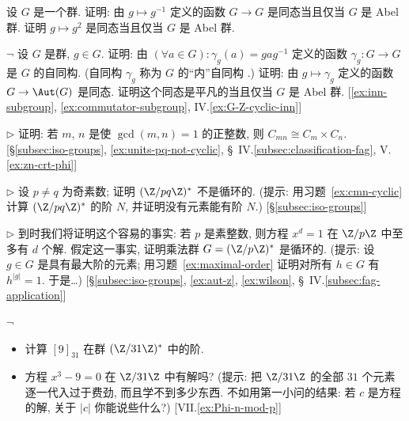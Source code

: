\begin{prob}
\label{ex:inverse-hom}
设 $G$ 是一个群. 证明: 由 $g \mapsto g^{-1}$ 定义的函数 $G \to G$ 是同态当且仅当 $G$ 是 Abel 群. 证明 $g \mapsto g^2$ 是同态当且仅当 $G$ 是 Abel 群.
\end{prob}

\begin{prob}
\label{ex:inner-automorphisms}
$\neg$ 设 $G$ 是群, $g \in G$. 证明: 由 $(\forall a \in G): \gamma_g(a) = gag^{-1}$ 定义的函数 $\gamma_g : G \to G$ 是 $G$ 的自同构. (自同构 $\gamma_g$ 称为 $G$ 的``内''自同构%
.) 证明: 由 $g \mapsto \gamma_g$ 定义的函数 $G \to \Aut(G)$ 是同态. 证明这个同态是平凡的当且仅当 $G$ 是 Abel 群. [\ref{ex:inn-subgroup}, \ref{ex:commutator-subgroup}, IV.\ref{ex:G-Z-cyclic-inn}]
\end{prob}

\begin{prob}
\label{ex:cmn-cyclic}
$\triangleright$ 证明: 若 $m$, $n$ 是使 $\gcd(m,n) = 1$ 的正整数, 则 $C_{mn} \cong C_m \times C_n$. [\S\ref{subsec:iso-groups}, \ref{ex:units-pq-not-cyclic}, \S~IV.\ref{subsec:classification-fag}, V.\ref{ex:zn-crt-phi}]
\end{prob}

\begin{prob}
\label{ex:units-pq-not-cyclic}
$\triangleright$ 设 $p \neq q$ 为奇素数; 证明 $(\Z/pq\Z)^{*}$ 不是循环的. (提示: 用习题~\ref{ex:cmn-cyclic} 计算 $(\Z/pq\Z)^{*}$ 的阶 $N$, 并证明没有元素能有阶 $N$.) [\S\ref{subsec:iso-groups}]
\end{prob}

\begin{prob}
\label{ex:units-cyclic}
$\triangleright$ 到时我们将证明这个容易的事实: 若 $p$ 是素整数, 则方程 $x^d = 1$ 在 $\Z/p\Z$ 中至多有 $d$ 个解. 假定这一事实, 证明乘法群 $G = (\Z/p\Z)^{*}$ 是循环的. (提示: 设 $g \in G$ 是具有最大阶的元素; 用习题~\ref{ex:maximal-order} 证明对所有 $h \in G$ 有 $h^{|g|} = 1$. 于是\ldots) [\S\ref{subsec:iso-groups}, \ref{ex:aut-z}, \ref{ex:wilson}, \S~IV.\ref{subsec:fag-application}]
\end{prob}

\begin{prob}
\label{ex:order-9-31}
$\neg$
\begin{itemize}
	\item 计算 $[9]_{31}$ 在群 $(\Z/31\Z)^{*}$ 中的阶.
	\item 方程 $x^3 - 9 = 0$ 在 $\Z/31\Z$ 中有解吗? (提示: 把 $\Z/31\Z$ 的全部 $31$ 个元素逐一代入过于费劲, 而且学不到多少东西. 不如用第一小问的结果: 若 $c$ 是方程的解, 关于 $|c|$ 你能说些什么?) [VII.\ref{ex:Phi-n-mod-p}]
\end{itemize}
\end{prob}

